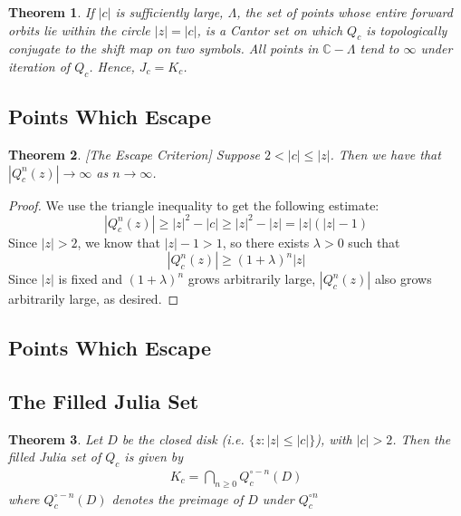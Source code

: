 \documentclass[symmetric]{tufte-handout}
\newtheorem{theorem}{Theorem}
\begin{document}
\begin{theorem}
If $|c|$ is sufficiently large, $\Lambda$, the set of points whose entire forward orbits lie within the circle $|z|=|c|$, is a Cantor set on which $Q_c$ is topologically conjugate to the shift map on two symbols. All points in $\mathbb{C} - \Lambda$ tend to $\infty$ under iteration of $Q_c$. Hence, $J_c=K_c$.
\end{theorem}



\subsection{Points Which Escape}



\begin{theorem} \label{escape} [The Escape Criterion]
Suppose $2 < |c| \le |z|$. Then we have that $|Q_c^n(z)| \rightarrow \infty$ as $n \rightarrow \infty$.

\end{theorem}
\begin{proof}
We use the triangle inequality to get the following estimate:
\begin{equation}
    |Q_c^n(z)| \geq |z|^2 - |c| \geq |z|^2 - |z| = |z|(|z|-1)
\end{equation}
Since $|z| > 2$, we know that $|z|-1>1$, so there exists $\lambda > 0$ such that 
\begin{equation}
    |Q_c^n(z)| \geq (1+\lambda)^n|z|
\end{equation}
Since $|z|$ is fixed and $(1+\lambda)^n$ grows arbitrarily large, $|Q_c^n(z)|$ also grows arbitrarily large, as desired.

\end{proof}




\subsection{Points Which Escape}




\subsection{The Filled Julia Set}

\begin{theorem}
Let $D$ be the closed disk (i.e. $\{z : |z| \le |c|\}$), with $|c|>2$. Then the filled Julia set of $Q_c$ is given by
\begin{align*}
K_c = \bigcap\limits_{n\ge 0} Q_c^{\circ -n} (D)
\end{align*}
where $Q_c^{\circ -n} (D)$ denotes the preimage of $D$ under $Q_c^{\circ n}$
\end{theorem}
\end{document}

